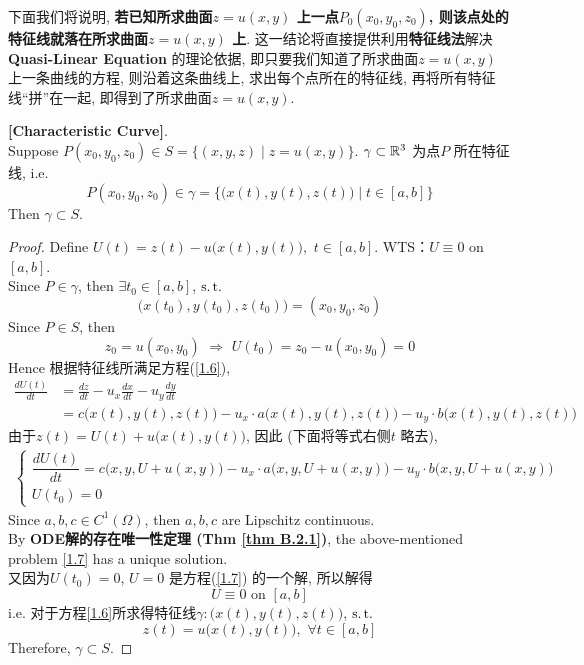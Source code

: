 	\vspace*{4em}
	
	下面我们将说明, \textbf{若已知所求曲面$z = u(x , y)$ 上一点$P_0(x_0 , y_0 , z_0)$, 则该点处的特征线就落在所求曲面$z = u(x , y)$ 上}. 这一结论将直接提供利用\textbf{特征线法}解决\textbf{Quasi-Linear Equation} 的理论依据, 即只要我们知道了所求曲面$z = u(x , y)$ 上一条曲线的方程, 则沿着这条曲线上, 求出每个点所在的特征线, 再将所有特征线“拼”在一起, 即得到了所求曲面$z = u(x , y)$. 
	
	\newpage
	
	\begin{thm}\label{thm 1.2.1}
		\textbf{[Characteristic Curve]}. \\
		Suppose $P(x_0 , y_0 , z_0) \in S = \Big\{ (x ,  y , z) \mid z = u(x , y) \Big\}$. $\gamma \subset \mathbb{R}^3$ 为点$P$ 所在特征线, i.e.
		\[ P (x_0 , y_0 , z_0) \in \gamma = \Big\{ \Big( x(t) , y(t) , z(t) \Big) \mid t \in [a , b] \Big\} \]
		Then $\gamma \subset S$. 
		
		\vspace*{6em}
		
		\begin{proof}
			Define $U(t) = z(t) - u\Big( x(t) , y(t) \Big) , \,\, t \in [a , b]$. WTS：$U \equiv 0$ on $[a , b]$. \\
			Since $P \in \gamma$, then $\exists t_0 \in [a , b]$, $\operatorname{s.t.}$
			\[ \Big( x(t_0) , y(t_0) , z(t_0) \Big) = (x_0 , y_0 , z_0) \]
			Since $P \in S$, then
			\[ z_0 = u(x_0 , y_0) \,\, \Rightarrow \,\, U(t_0) = z_0 - u(x_0 , y_0) = 0 \]
			Hence 根据特征线所满足方程(\ref{1.6}), 
			\begin{align*}
				\frac{dU(t)}{dt} 
				&= \frac{dz}{dt} - u_x \frac{dx}{dt} - u_y \frac{dy}{dt} \\
				&= c \Big( x(t) , y(t) , z(t) \Big) - u_x \cdot a \Big( x(t) , y(t) , z(t) \Big) - u_y \cdot b \Big( x(t) , y(t) , z(t) \Big) 
			\end{align*}
			由于$z(t) = U(t) + u\Big( x(t) , y(t) \Big)$, 因此 (下面将等式右侧$t$ 略去), 
			\begin{align}
				\begin{cases}
					\dfrac{dU(t)}{dt} 
					= c \Big( x , y , U + u(x , y) \Big) - u_x \cdot a \Big( x , y , U + u(x , y) \Big) - u_y \cdot b \Big( x , y , U + u(x , y) \Big) \\
					U(t_0) = 0
				\end{cases}\label{1.7}
			\end{align}
			Since $a , b , c \in C^1(\Omega)$, then $a , b , c$ are Lipschitz continuous. \\
			By \textbf{ODE解的存在唯一性定理 (Thm \ref{thm B.2.1})}, the above-mentioned problem \ref{1.7} has a unique solution. \\
			又因为$U(t_0) = 0$, $U = 0$ 是方程(\ref{1.7}) 的一个解, 所以解得
			\[ U \equiv 0 \,\, \text{on} \,\, [a , b] \]
			i.e. 对于方程\ref{1.6}所求得特征线$\gamma : \Big( x(t) , y(t) , z(t) \Big)$, $\operatorname{s.t.}$
			\[ z(t) = u\Big( x(t) , y(t) \Big) , \,\, \forall t \in [a , b] \]
			Therefore, $\gamma \subset S$. 
		\end{proof}
	\end{thm}

